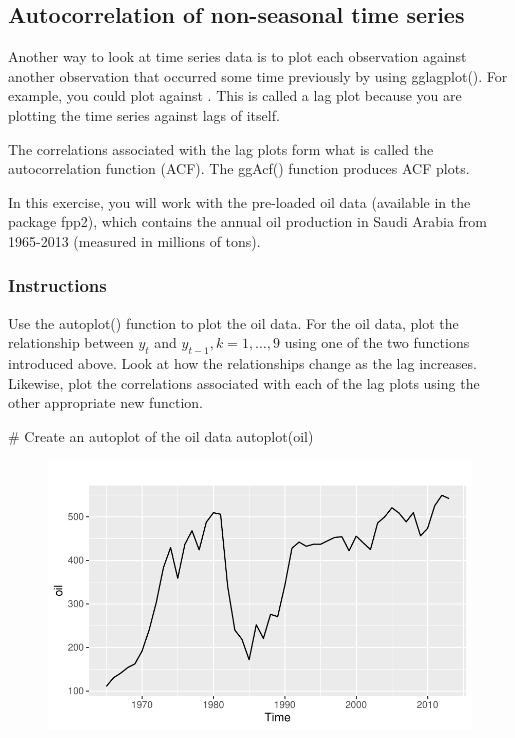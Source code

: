 \documentclass[
  letterpaper,
  DIV=11,
  numbers=noendperiod]{scrartcl}
\newenvironment{Shaded}{\begin{snugshade}}{\end{snugshade}}
\newcommand{\CommentTok}[1]{\textcolor[rgb]{0.37,0.37,0.37}{#1}}
\newcommand{\FunctionTok}[1]{\textcolor[rgb]{0.28,0.35,0.67}{#1}}
\newcommand{\NormalTok}[1]{\textcolor[rgb]{0.00,0.23,0.31}{#1}}
\begin{document}
\hypertarget{autocorrelation-of-non-seasonal-time-series}{%
\subsection{Autocorrelation of non-seasonal time
series}\label{autocorrelation-of-non-seasonal-time-series}}

Another way to look at time series data is to plot each observation
against another observation that occurred some time previously by using
gglagplot(). For example, you could plot against . This is called a lag
plot because you are plotting the time series against lags of itself.

The correlations associated with the lag plots form what is called the
autocorrelation function (ACF). The ggAcf() function produces ACF plots.

In this exercise, you will work with the pre-loaded oil data (available
in the package fpp2), which contains the annual oil production in Saudi
Arabia from 1965-2013 (measured in millions of tons).

\hypertarget{instructions-1}{%
\subsubsection{Instructions}\label{instructions-1}}

Use the autoplot() function to plot the oil data. For the oil data, plot
the relationship between \(y_t\) and \(y_{t-1}, k=1,\dots,9\) using one
of the two functions introduced above. Look at how the relationships
change as the lag increases. Likewise, plot the correlations associated
with each of the lag plots using the other appropriate new function.

\begin{Shaded}
\begin{Highlighting}[]
\CommentTok{\# Create an autoplot of the oil data}
\FunctionTok{autoplot}\NormalTok{(oil)}
\end{Highlighting}
\end{Shaded}

\begin{figure}[H]

{\centering \includegraphics{forecasting_datacamp_ex_files/figure-pdf/unnamed-chunk-4-1.pdf}

}

\end{figure}
\end{document}

